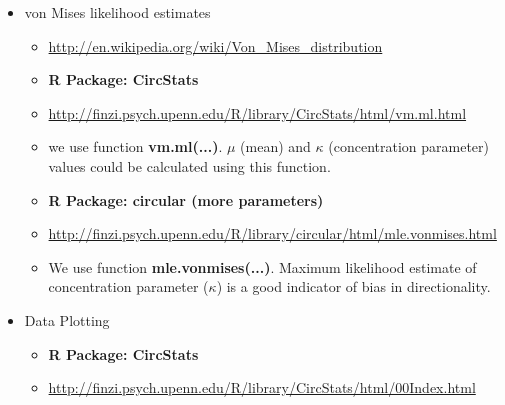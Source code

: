 \documentclass[11pnt, twocolumn]{article}
\begin{document}
\begin{itemize}
\item von Mises likelihood estimates
\begin{itemize}
\item \url{http://en.wikipedia.org/wiki/Von\_Mises\_distribution}
\item \textbf{R Package: CircStats}
\item \url{http://finzi.psych.upenn.edu/R/library/CircStats/html/vm.ml.html}
\item we use function \textbf{vm.ml(...)}. $\mu$ (mean) and $\kappa$ (concentration parameter) values could be calculated using this function. 
  
\item \textbf{R Package: circular (more parameters)}
\item \url{http://finzi.psych.upenn.edu/R/library/circular/html/mle.vonmises.html}
\item We use function \textbf{mle.vonmises(...)}. Maximum likelihood estimate of concentration parameter ($\kappa$) is a good indicator of bias in directionality. 
\end{itemize}
\end{itemize}

\begin{itemize}
\item Data Plotting
\begin{itemize}
\item \textbf{R Package: CircStats}
\item \url{http://finzi.psych.upenn.edu/R/library/CircStats/html/00Index.html}
\end{itemize}
\end{itemize}







\end{document}

